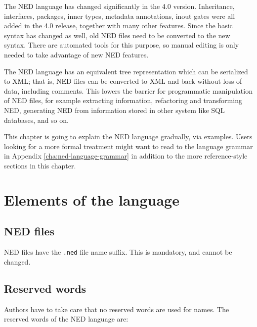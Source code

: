 \begin{note}
    The NED language has changed significantly in the 4.0 version.
    Inheritance, interfaces, packages, inner types, metadata annotations, inout
    gates were all added in the 4.0 release, together with many other features.
    Since the basic syntax has changed as well, old NED files need to be
    converted to the new syntax. There are automated tools for this purpose, so
    manual editing is only needed to take advantage of new NED features.
\end{note}

The NED language has an equivalent tree representation which can be
serialized to XML; that is, NED files can be converted to XML and back
without loss of data, including comments. This lowers the barrier for
programmatic manipulation of NED files, for example extracting information,
refactoring and transforming NED, generating NED from information stored in
other system like SQL databases, and so on.

\begin{note}
    This chapter is going to explain the NED language gradually, via examples.
    Users looking for a more formal treatment might want to read to the
    language grammar in Appendix \ref{cha:ned-language-grammar} in addition to
    the more reference-style sections in this chapter.
\end{note}


\section{Elements of the language}

\subsection{NED files}

NED files have the \texttt{.ned} file name suffix. This is mandatory, and
cannot be changed.


\subsection{Reserved words}

Authors have to take care that no reserved words are used for names.
The reserved words of the NED language are:



